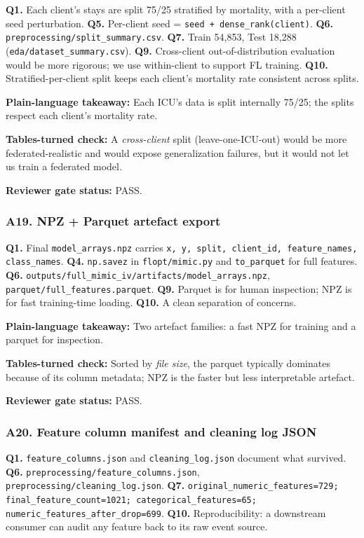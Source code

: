 \documentclass{article}
\begin{document}
\textbf{Q1.} Each client's stays are split 75/25 stratified by mortality, with a per-client seed perturbation. \textbf{Q5.} Per-client seed = \texttt{seed + dense\_rank(client)}. \textbf{Q6.} \texttt{preprocessing/split\_summary.csv}. \textbf{Q7.} Train 54,853, Test 18,288 (\texttt{eda/dataset\_summary.csv}). \textbf{Q9.} Cross-client out-of-distribution evaluation would be more rigorous; we use within-client to support FL training. \textbf{Q10.} Stratified-per-client split keeps each client's mortality rate consistent across splits.


\textbf{Plain-language takeaway:} Each ICU's data is split internally 75/25; the splits respect each client's mortality rate.


\textbf{Tables-turned check:} A \emph{cross-client} split (leave-one-ICU-out) would be more federated-realistic and would expose generalization failures, but it would not let us train a federated model.


\textbf{Reviewer gate status:} PASS.


\subsubsection{A19. NPZ + Parquet artefact export}


\textbf{Q1.} Final \texttt{model\_arrays.npz} carries \texttt{x, y, split, client\_id, feature\_names, class\_names}. \textbf{Q4.} \texttt{np.savez} in \texttt{flopt/mimic.py} and \texttt{to\_parquet} for full features. \textbf{Q6.} \texttt{outputs/full\_mimic\_iv/artifacts/model\_arrays.npz}, \texttt{parquet/full\_features.parquet}. \textbf{Q9.} Parquet is for human inspection; NPZ is for fast training-time loading. \textbf{Q10.} A clean separation of concerns.


\textbf{Plain-language takeaway:} Two artefact families: a fast NPZ for training and a parquet for inspection.


\textbf{Tables-turned check:} Sorted by \emph{file size}, the parquet typically dominates because of its column metadata; NPZ is the faster but less interpretable artefact.


\textbf{Reviewer gate status:} PASS.


\subsubsection{A20. Feature column manifest and cleaning log JSON}


\textbf{Q1.} \texttt{feature\_columns.json} and \texttt{cleaning\_log.json} document what survived. \textbf{Q6.} \texttt{preprocessing/feature\_columns.json}, \texttt{preprocessing/cleaning\_log.json}. \textbf{Q7.} \texttt{original\_numeric\_features=729; final\_feature\_count=1021; categorical\_features=65; numeric\_features\_after\_drop=699}. \textbf{Q10.} Reproducibility: a downstream consumer can audit any feature back to its raw event source.
\end{document}
